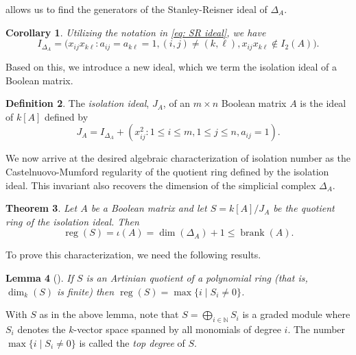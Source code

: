 \documentclass[11pt,letterpaper, reqno]{amsart}
\newtheorem{theorem}{Theorem}[section]
\newtheorem{lemma}[theorem]{Lemma}
\newtheorem{corollary}[theorem]{Corollary}
\theoremstyle{definition}
\newtheorem{definition}[theorem]{Definition}
\theoremstyle{remark}
\newtheorem{remark}[theorem]{Remark}
\DeclareMathOperator{\reg}{reg}
\DeclareMathOperator{\brank}{brank}
\DeclareMathOperator{\soc}{socle}
\numberwithin{equation}{section}
\begin{document}
  allows us to find the generators of the Stanley-Reisner ideal of $\Delta_A$. 
\begin{corollary}
 Utilizing the notation in \eqref{eq: SR ideal}, we have
\[
I_{\Delta_A}= \big (x_{ij}x_{k\ell}: a_{ij}=a_{k\ell}=1, (i,j)\neq (k,\ell), x_{ij}x_{k\ell}\not \in  I_2(A)\big ).
\]
\end{corollary}


Based on this, we introduce a new ideal, which we term the isolation ideal of a Boolean matrix.

\begin{definition}
The \textit{isolation ideal}, $J_A$, of an $m\times n$ Boolean matrix $A$ is the ideal of $k[A]$ defined by 
\begin{equation}\label{eq: J}
J_A = I_{\Delta_A} + \left(x_{ij}^2: 1\leq i\leq m,1\leq j\leq n, a_{ij}=1 \right).
\end{equation}
\end{definition}

We now arrive at the desired algebraic characterization of isolation number as the Castelnuovo-Mumford regularity of the quotient ring defined by the isolation ideal. This invariant also recovers the dimension of the simplicial complex $\Delta_A$.

\begin{theorem}\label{thm: isolation number = reg}
Let $A$ be a Boolean matrix and let $S=k[A]/J_A$ be the quotient ring of the isolation ideal. Then 
\[
\reg(S) =  \iota(A) = \dim(\Delta_A) +1 \leq \brank(A).
\]
\end{theorem}

To prove this characterization, we need the following results.

\begin{lemma}[{\cite[Theorem 18.4]{Peeva}}]\label{lem: reg=top degree}
If $S$ is an Artinian quotient of a polynomial ring (that is, $\dim_k(S)$ is finite) then $\reg(S)=\max\{i\mid S_i\neq 0\}$.
\end{lemma}

With $S$ as in the above lemma, note that $S=\bigoplus_{i\in \mathbb{N}} S_i$ is a graded module where $S_i$ denotes the $k$-vector space spanned by all monomials of degree $i$. The number $\max\{i\mid S_i\neq 0\}$ is called the \textit{top degree} of $S$. 
\end{document}
